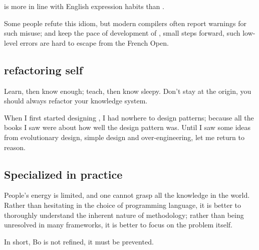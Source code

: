 \begin{content}
 is more in line with English expression habits than .

Some people refute this idiom, but modern compilers often report warnings for such misuse; and keep the pace of development of , small steps forward, such low-level errors are hard to escape from the French Open.

\subsection{refactoring self}

Learn, then know enough; teach, then know sleepy. Don't stay at the origin, you should always refactor your knowledge system.

When I first started designing , I had nowhere to design patterns; because all the books I saw were about how well the design pattern was. Until I saw some ideas from evolutionary design, simple design and over-engineering, let me return to reason.

\subsection{Specialized in practice}

People's energy is limited, and one cannot grasp all the knowledge in the world. Rather than hesitating in the choice of programming language, it is better to thoroughly understand the inherent nature of methodology; rather than being unresolved in many frameworks, it is better to focus on the problem itself.

In short, Bo is not refined, it must be prevented.

\end{content}